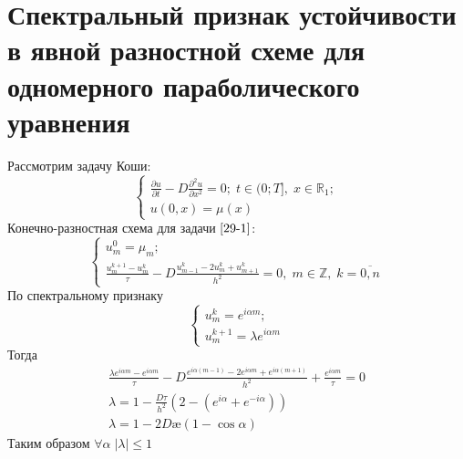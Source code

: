 \documentclass[__main__.tex]{subfiles}
\begin{document}
\section{Спектральный признак устойчивости в явной разностной схеме для одномерного параболического уравнения}

Рассмотрим задачу Коши:
\begin{equation}
	\begin{cases}
	\frac{\partial u}{\partial t} - D \frac{\partial^2 u}{\partial x^2} = 0; \; t \in (0;T], \; x \in \mathbb{R}_1;\\
	u(0, x) = \mu(x)
	\end{cases}
	\label{29-1}
\end{equation}
Конечно-разностная схема для задачи $\ref{29-1}$:
\begin{equation*}
	\begin{cases}
	u^0_m = \mu_m;\\
	\frac{u^{k+1}_m - u^k_m}{\tau} - D\frac{u^k_{m-1} - 2u^k_m + u^k_{m+1}}{h^2} = 0, \; m \in \mathbb{Z}, \; k = \overline{0, n}
	\end{cases}
\end{equation*}
По спектральному признаку 
\begin{equation*}
	\begin{cases}
	u^k_m = e^{i \alpha m};\\
	u^{k+1}_m = \lambda e^{i \alpha m}
	\end{cases}
\end{equation*}
Тогда
\begin{gather*}
\frac{\lambda e^{i \alpha m} - e^{i \alpha m}}{\tau} - D \frac{e^{i \alpha (m-1)} - 2e^{i \alpha m} + e^{i \alpha (m+1)}}{h^2} + \frac{e^{i \alpha m}}{\tau} = 0\\
\lambda = 1 - \frac{D\tau}{h^2}(2 - (e^{i \alpha} + e^{-i \alpha}))\\
\lambda = 1 - 2D\text{\ae}(1 - \cos{\alpha})
\end{gather*}
Таким образом $\forall \alpha \; |\lambda| \le 1$
\end{document}
